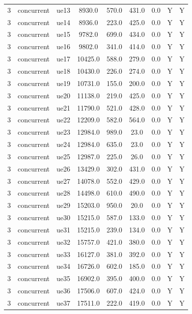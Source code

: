 \begin{table}[ht]
\begin{tabular}{|c|c|c|c|c|c|c|c|c|}
3 & concurrent & ue13 & 8930.0 & 570.0 & 431.0 & 0.0 & Y & Y \\
3 & concurrent & ue14 & 8936.0 & 223.0 & 425.0 & 0.0 & Y & Y \\
3 & concurrent & ue15 & 9782.0 & 699.0 & 434.0 & 0.0 & Y & Y \\
3 & concurrent & ue16 & 9802.0 & 341.0 & 414.0 & 0.0 & Y & Y \\
3 & concurrent & ue17 & 10425.0 & 588.0 & 279.0 & 0.0 & Y & Y \\
3 & concurrent & ue18 & 10430.0 & 226.0 & 274.0 & 0.0 & Y & Y \\
3 & concurrent & ue19 & 10731.0 & 155.0 & 200.0 & 0.0 & Y & Y \\
3 & concurrent & ue20 & 11138.0 & 219.0 & 425.0 & 0.0 & Y & Y \\
3 & concurrent & ue21 & 11790.0 & 521.0 & 428.0 & 0.0 & Y & Y \\
3 & concurrent & ue22 & 12209.0 & 582.0 & 564.0 & 0.0 & Y & Y \\
3 & concurrent & ue23 & 12984.0 & 989.0 & 23.0 & 0.0 & Y & Y \\
3 & concurrent & ue24 & 12984.0 & 635.0 & 23.0 & 0.0 & Y & Y \\
3 & concurrent & ue25 & 12987.0 & 225.0 & 26.0 & 0.0 & Y & Y \\
3 & concurrent & ue26 & 13429.0 & 302.0 & 431.0 & 0.0 & Y & Y \\
3 & concurrent & ue27 & 14078.0 & 552.0 & 429.0 & 0.0 & Y & Y \\
3 & concurrent & ue28 & 14498.0 & 610.0 & 490.0 & 0.0 & Y & Y \\
3 & concurrent & ue29 & 15203.0 & 950.0 & 20.0 & 0.0 & Y & Y \\
3 & concurrent & ue30 & 15215.0 & 587.0 & 133.0 & 0.0 & Y & Y \\
3 & concurrent & ue31 & 15215.0 & 239.0 & 134.0 & 0.0 & Y & Y \\
3 & concurrent & ue32 & 15757.0 & 421.0 & 380.0 & 0.0 & Y & Y \\
3 & concurrent & ue33 & 16127.0 & 381.0 & 392.0 & 0.0 & Y & Y \\
3 & concurrent & ue34 & 16726.0 & 602.0 & 185.0 & 0.0 & Y & Y \\
3 & concurrent & ue35 & 16902.0 & 395.0 & 400.0 & 0.0 & Y & Y \\
3 & concurrent & ue36 & 17506.0 & 607.0 & 424.0 & 0.0 & Y & Y \\
3 & concurrent & ue37 & 17511.0 & 222.0 & 419.0 & 0.0 & Y & Y \\

\end{tabular}
\end{table}
